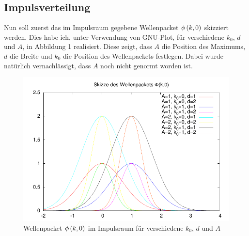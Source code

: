 \subsection{Impulsverteilung}
Nun soll zuerst das im Impulsraum gegebene Wellenpacket $\phi\del{k,0}$ skizziert werden. Dies habe ich, unter Verwendung von GNU-Plot, für verschiedene $k_0$, $d$ und $A$, in Abbildung 1 realisiert. Diese zeigt, dass $A$ die Position des Maximums, $d$ die Breite und $k_0$ die Position des Wellenpackets festlegen. Dabei wurde natürlich vernachlässigt, dass $A$ noch nicht genormt worden ist.
\begin{figure}[ht]
	\centering
	\includegraphics[scale=1.3]{Skizze_zu_3_1.pdf}
	\caption{Wellenpacket $\phi\del{k,0}$ im Impulsraum für verschiedene $k_0$, $d$ und $A$}
\end{figure}

